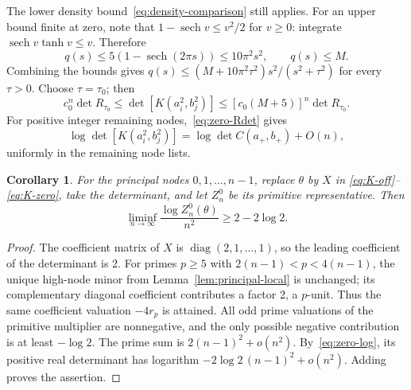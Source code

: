 \documentclass[11pt]{article}
\newtheorem{corollary}[theorem]{Corollary}
\theoremstyle{definition}
\theoremstyle{remark}
\numberwithin{equation}{section}
\DeclareMathOperator{\sech}{sech}
\DeclareMathOperator{\diag}{diag}
\begin{document}
The lower density bound~\eqref{eq:density-comparison} still applies.
For an upper bound finite at zero, note that
$1-\sech v\leq v^2/2$ for $v\geq0$: integrate
$\sech v\tanh v\leq v$. Therefore
\[
 q(s)\leq5(1-\sech(2\pi s))\leq10\pi^2s^2,
 \qquad q(s)\leq M.
\]
Combining the bounds gives
$q(s)\leq(M+10\pi^2\tau^2)s^2/(s^2+\tau^2)$ for every $\tau>0$.
Choose $\tau=\tau_0$; then
\begin{equation}\label{eq:zero-comparison}
 c_0^n\det R_{\tau_0}
 \leq\det[K(a_i^2,b_j^2)]
 \leq[c_0(M+5)]^n\det R_{\tau_0}.
\end{equation}
For positive integer remaining nodes,~\eqref{eq:zero-Rdet} gives
\begin{equation}\label{eq:zero-log}
 \log\det[K(a_i^2,b_j^2)]
 =\log\det C(a_+,b_+)+O(n),
\end{equation}
uniformly in the remaining node lists.

\begin{corollary}\label{cor:zero}
For the principal nodes $0,1,\ldots,n-1$, replace $\theta$ by $X$ in
\eqref{eq:K-off}--\eqref{eq:K-zero}, take the determinant, and let
$Z_n^0$ be its primitive representative. Then
\[
 \liminf_{n\to\infty}\frac{\log Z_n^0(\theta)}{n^2}
 \geq2-2\log2.
\]
\end{corollary}

\begin{proof}
The coefficient matrix of $X$ is $\diag(2,1,\ldots,1)$, so the leading
coefficient of the determinant is 2. For primes $p\geq5$ with
$2(n-1)<p<4(n-1)$,
the unique high-node minor from Lemma~\ref{lem:principal-local} is
unchanged; its complementary diagonal coefficient contributes a factor
2, a $p$-unit. Thus the same coefficient valuation $-4r_p$ is attained.
All odd prime valuations of the primitive multiplier are nonnegative,
and the only possible negative contribution is at least $-\log2$.
The prime sum is $2(n-1)^2+o(n^2)$. By~\eqref{eq:zero-log}, its positive
real determinant has logarithm $-2\log2\,(n-1)^2+o(n^2)$. Adding proves
the assertion.
\end{proof}
\end{document}
